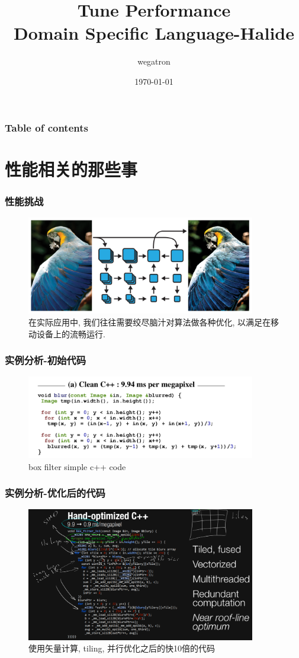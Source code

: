 \documentclass[hyperref]{beamer}
\title{Tune Performance \\ Domain Specific Language-Halide}
\author{wegatron}
\date{\today}
\begin{document}
\begin{frame}
\titlepage
\end{frame} 

\begin{frame}
\frametitle{Table of contents}
\tableofcontents
\end{frame} 


\section{性能相关的那些事}
\begin{frame}
\frametitle{性能挑战}
\begin{figure}[H]
  \centering
  \includegraphics[width=10cm]{laplacian_filter.png}
  \caption{在实际应用中, 我们往往需要绞尽脑汁对算法做各种优化, 以满足在移动设备上的流畅运行.}
  \label{fig:laplacian-filter}
\end{figure}
\end{frame}

\begin{frame}
  \frametitle{实例分析-初始代码}
  \begin{figure}[H]
    \centering
    \includegraphics[width=10cm]{clean_c++.png}
    \caption{box filter simple c++ code}
    \label{fig:box-simple-c++}
  \end{figure}
\end{frame}

\begin{frame}
  \frametitle{实例分析-优化后的代码}
  \begin{figure}[H]
    \centering
    \includegraphics[width=10cm]{fast_c++.png}
    \caption{\tiny 使用矢量计算, tiling, 并行优化之后的快10倍的代码}
    \label{fig:box-fast-c++}
  \end{figure}
\end{frame}
\end{document}
